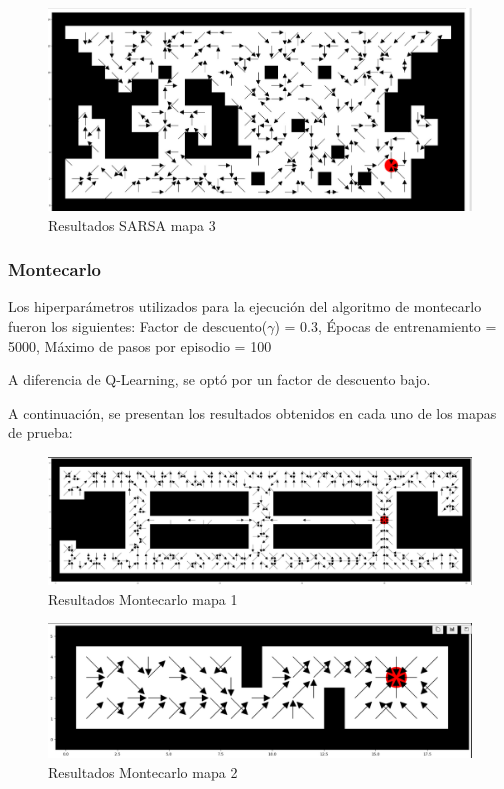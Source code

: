 \documentclass[conference,a4paper]{IEEEtran}
\begin{document}
\begin{figure}[h]
  \centering
  \includegraphics[scale=0.23]{resultado_sarsa_mapa_3}
  \caption{Resultados SARSA mapa 3}
  \label{fig:resultado_sarsa_mapa_3}
\end{figure}

\subsubsection{\textbf{Montecarlo}}

Los hiperparámetros utilizados para la ejecución del algoritmo de montecarlo fueron los siguientes:
Factor de descuento($\gamma$) = 0.3, Épocas de entrenamiento = 5000, Máximo de pasos por episodio = 100\newline

A diferencia de Q-Learning, se optó por un factor de descuento  bajo.\newline

A continuación, se presentan los resultados obtenidos en cada uno de los mapas de prueba:\newline

\begin{figure}[h]
  \centering
  \includegraphics[scale=0.2]{report/Montecarlo.png}
  \caption{Resultados Montecarlo mapa 1}
  \label{fig:Montecarlo}
\end{figure}

\begin{figure}[h]
  \centering
  \includegraphics[scale=0.2]{report/Montecarlo2.png}
  \caption{Resultados Montecarlo mapa 2}
  \label{fig:Montecarlo2}
\end{figure}
\end{document}
